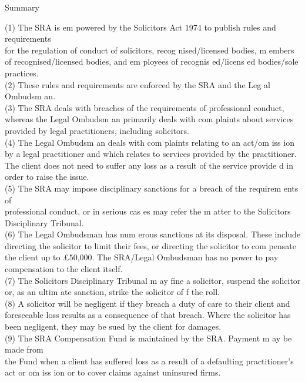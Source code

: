 \documentclass[
]{article}
\newenvironment{env-131bf3d9-4263-4e79-8eed-44c374685e2a}
{
    \savenotes\tcolorbox[blanker,breakable,left=5pt,borderline west={2pt}{-4pt}{gray}]
}
{
    \endtcolorbox\spewnotes
}
\begin{document}
\begin{env-131bf3d9-4263-4e79-8eed-44c374685e2a}

Summary

(1) The SRA is em powered by the Solicitors Act 1974 to publish rules
and requirements\\
for the regulation of conduct of solicitors, recog nised/licensed
bodies, m embers of recognised/licensed bodies, and em ployees of
recognis ed/licens ed bodies/sole\\
practices.\\
(2) These rules and requirements are enforced by the SRA and the Leg al
Ombudsm an.\\
(3) The SRA deals with breaches of the requirements of professional
conduct, whereas the Legal Ombudsm an primarily deals with com plaints
about services provided by legal practitioners, including solicitors.\\
(4) The Legal Ombudsm an deals with com plaints relating to an act/om
iss ion by a legal practitioner and which relates to services provided
by the practitioner. The client does not need to suffer any loss as a
result of the service provide d in order to raise the issue.\\
(5) The SRA may impose disciplinary sanctions for a breach of the
requirem ents of\\
professional conduct, or in serious cas es may refer the m atter to the
Solicitors\\
Disciplinary Tribunal.\\
(6) The Legal Ombudsman has num erous sanctions at its disposal. These
include\\
directing the solicitor to limit their fees, or directing the solicitor
to com pensate the client up to £50,000. The SRA/Legal Ombudsman has no
power to pay\\
compensation to the client itself.\\
(7) The Solicitors Disciplinary Tribunal m ay fine a solicitor, suspend
the solicitor or, as an ultim ate sanction, strike the solicitor of f
the roll.\\
(8) A solicitor will be negligent if they breach a duty of care to their
client and\\
foreseeable loss results as a consequence of that breach. Where the
solicitor has\\
been negligent, they may be sued by the client for damages.\\
(9) The SRA Compensation Fund is maintained by the SRA. Payment m ay be
made from\\
the Fund when a client has suffered loss as a result of a defaulting
practitioner's act or om iss ion or to cover claims against uninsured
firms.

\end{env-131bf3d9-4263-4e79-8eed-44c374685e2a}
\end{document}

